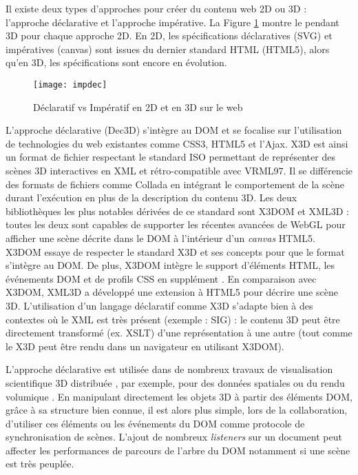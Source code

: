 Il existe deux types d'approches pour créer du contenu web 2D ou 
3D : l'approche déclarative et l'approche impérative. La Figure \ref{fig:impdec} 
montre le pendant \gls{3D} pour chaque approche 2D. En 2D, les spécifications 
déclaratives (\gls{SVG}) et impératives (canvas) sont issues du dernier standard 
HTML (HTML5), alors qu'en \gls{3D}, les spécifications sont encore en évolution. 

\begin{figure}[hbt]
	\centering
	\texttt{[image: impdec]}
	\caption{Déclaratif vs Impératif en 2D et en \gls{3D} sur le web}
	\label{fig:impdec}
\end{figure}

L'approche déclarative (Dec3D) s'intègre au \gls{DOM} et se 
focalise sur l'utilisation de technologies du web existantes comme CSS3, 
HTML5 et l'Ajax. 
X3D est ainsi un format de fichier respectant le standard ISO \cite{X3D2011} permettant de 
représenter des scènes \gls{3D} interactives en XML et rétro-compatible avec 
VRML97. Il 
se différencie des formats de fichiers comme Collada en intégrant le comportement de 
la scène durant l'exécution en plus de la description du contenu \gls{3D}. Les deux 
bibliothèques les plus notables dérivées de ce standard sont X3DOM 
\cite{Behr2010} et XML3D \cite{Sons2010} : toutes les deux sont capables de 
supporter les récentes avancées de WebGL pour afficher une scène décrite dans 
le \gls{DOM} à l'intérieur d'un \textit{canvas} HTML5. 
X3DOM essaye de respecter le standard X3D et ses concepts pour que le format s'intègre au \gls{DOM}. De plus, X3DOM intègre le support 
d'éléments \gls{HTML}, les événements \gls{DOM} et de profils \acrshort{CSS} en 
supplément \cite{Sutter2015}. 
En comparaison avec X3DOM, XML3D a développé une extension à \gls{HTML}5 
pour décrire une scène \gls{3D}. 
L'utilisation d'un langage déclaratif comme X3D s'adapte bien à des contextes où 
le XML est très présent (exemple : \gls{SIG}) : le contenu \gls{3D} peut être 
directement transformé (ex. XSLT) d'une 
représentation à une autre (tout comme le X3D peut être rendu dans un navigateur 
en utilisant X3DOM). 

L'approche déclarative est utilisée dans de nombreux travaux de visualisation 
scientifique \gls{3D} distribuée \cite{Jung2012}, par exemple, pour des données 
spatiales 
\cite{Stein2014} ou du rendu volumique \cite{Becher2012}. 
En manipulant directement les objets \gls{3D} à partir des éléments \gls{DOM}, 
grâce à 
sa structure bien connue, il est alors plus simple, lors de la collaboration, d'utiliser 
ces éléments \cite{Gadea2016} ou les événements du \gls{DOM} \cite{Lowet2009} 
comme protocole de synchronisation de scènes. 
L'ajout de nombreux \textit{listeners} sur un document peut affecter les 
performances de parcours de l'arbre du \gls{DOM} notamment si une scène est
très peuplée.

